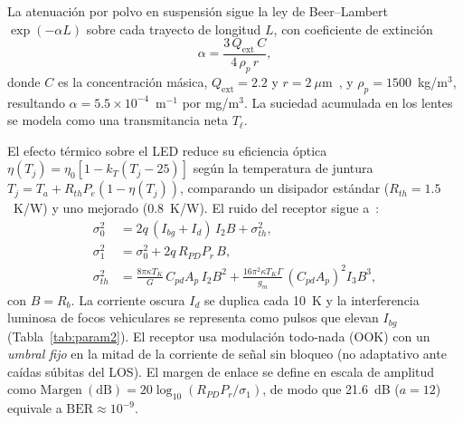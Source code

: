 \documentclass[conference]{IEEEtran}
\begin{document}
La atenuación por polvo en suspensión sigue la ley de Beer--Lambert $\exp(-\alpha L)$ sobre cada trayecto de longitud $L$, con coeficiente de extinción
\begin{equation}
\alpha=\frac{3\,Q_{\mathrm{ext}}\,C}{4\,\rho_p\,r},
\label{eq:polvo}
\end{equation}
donde $C$ es la concentración másica, $Q_{\mathrm{ext}}=2.2$ y $r=2~\mu$m~\cite{li2024}, y $\rho_p=1500$~kg/m$^3$, resultando $\alpha=5.5\times10^{-4}$~m$^{-1}$ por mg/m$^3$. La suciedad acumulada en los lentes se modela como una transmitancia neta $T_{\ell}$.

El efecto térmico sobre el LED reduce su eficiencia óptica $\eta(T_j)=\eta_0[1-k_T(T_j-25)]$ según la temperatura de juntura $T_j=T_a+R_{th}P_e(1-\eta(T_j))$, comparando un disipador estándar ($R_{th}=1.5$~K/W) y uno mejorado (0.8~K/W). El ruido del receptor sigue a~\cite{palacios2020,komine2004}:
\begin{align}
\sigma_0^{2}&=2q\,(I_{bg}+I_d)\,I_2B+\sigma_{th}^{2},\label{eq:s0}\\
\sigma_1^{2}&=\sigma_0^{2}+2q\,R_{PD}P_r\,B,\label{eq:s1}\\
\sigma_{th}^{2}&=\frac{8\pi\kappa T_K}{G}\,C_{pd}A_p\,I_2B^{2}+\frac{16\pi^{2}\kappa T_K\Gamma}{g_m}\,(C_{pd}A_p)^{2}I_3B^{3},\label{eq:th}
\end{align}
con $B=R_b$. La corriente oscura $I_d$ se duplica cada 10~K y la interferencia luminosa de focos vehiculares se representa como pulsos que elevan $I_{bg}$ (Tabla~\ref{tab:param2}). El receptor usa modulación todo-nada (OOK) con un \emph{umbral fijo} en la mitad de la corriente de señal sin bloqueo (no adaptativo ante caídas súbitas del LOS). El margen de enlace se define en escala de amplitud como $\mathrm{Margen~(dB)}=20\log_{10}(R_{PD}P_r/\sigma_1)$, de modo que 21.6~dB ($a=12$) equivale a $\mathrm{BER}\approx 10^{-9}$.
\end{document}
